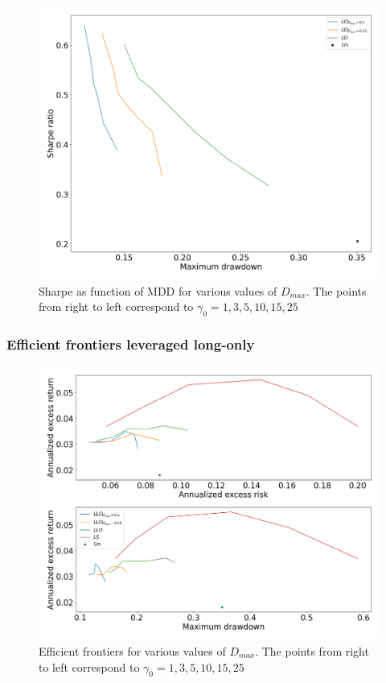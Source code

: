 \begin{figure}[H]
    \centering
    \includegraphics[width=1\textwidth]{analysis/portfolio_exercise/images/mle/sharpe_mdd_lo.png}
    \caption[Sharpe as function of MDD for various values of $D_{max}$]{Sharpe as function of MDD for various values of $D_{max}$. The points from right to left correspond to $\gamma_0=1,3,5,10,15,25$}
    \label{fig:MPC_sharpe_mdd_ls}
\end{figure}

\subsubsection*{Efficient frontiers leveraged long-only}

\begin{figure}[H]
    \centering
    \includegraphics[width=1\textwidth]{analysis/portfolio_exercise/images/mle/frontier_llo.png}
    \caption[Efficient frontiers for various values of $D_{max}$]{Efficient frontiers for various values of $D_{max}$. The points from right to left correspond to $\gamma_0=1,3,5,10,15,25$}
    \label{fig:MPC_frontier_llo}
\end{figure}

